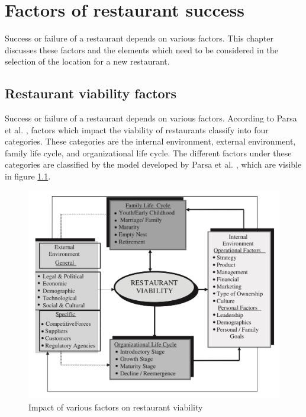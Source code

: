 \documentclass[a4paper, 11pt, oneside]{Thesis}  %
\begin{document}
\chapter{Factors of restaurant success}
\label{factors_of_restaurant_success}

Success or failure of a restaurant depends on various factors. This chapter discusses these factors and the elements which need to be considered in the selection of the location for a new restaurant.

\section{Restaurant viability factors}
\label{viability_factors}

Success or failure of a restaurant depends on various factors. According to Parsa et al. \cite{Parsa.2005}, factors which impact the viability of restaurants classify into four categories. These categories are the internal environment, external environment, family life cycle, and organizational life cycle. The different factors under these categories are classified by the model developed by Parsa et al. \cite{Parsa.2005}, which are visible in figure \ref{fig:Factors_on_restaurant_viability}. 

\begin{figure}[h]
\includegraphics[scale=0.5]{Figures/Restaurant_sucess_factors/Factors_on_restaurant_viability.png}
\centering
\caption{Impact of various factors on restaurant viability \cite{Parsa.2005}}
\label{fig:Factors_on_restaurant_viability}
\end{figure}
\end{document}
